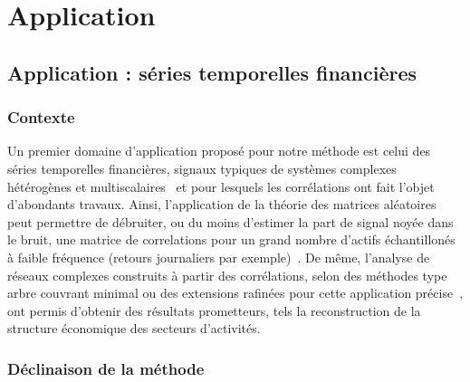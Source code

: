 \section{Application}



\subsection{Application : séries temporelles financières}


\subsubsection{Contexte}

Un premier domaine d'application proposé pour notre méthode est celui des séries temporelles financières, signaux typiques de systèmes complexes hétérogènes et multiscalaires~\cite{mantegna2000introduction} et pour lesquels les corrélations ont fait l'objet d'abondants travaux. Ainsi, l'application de la théorie des matrices aléatoires peut permettre de débruiter, ou du moins d'estimer la part de signal noyée dans le bruit, une matrice de correlations pour un grand nombre d'actifs échantillonés à faible fréquence (retours journaliers par exemple)~\cite{2009arXiv0910.1205B}. De même, l'analyse de réseaux complexes construits à partir des corrélations, selon des méthodes type arbre couvrant minimal %
ou des extensions rafinées pour cette application précise~\cite{tumminello2005tool}, ont permis d'obtenir des résultats prometteurs, tels la reconstruction de la structure économique des secteurs d'activités.


\subsubsection{Déclinaison de la méthode}


